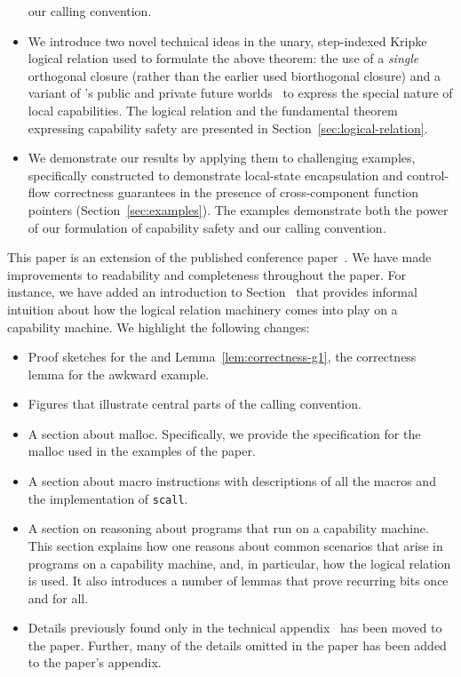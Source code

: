 \documentclass[format=acmsmall, review=true, screen=true]{acmart}
\renewcommand{\sectionname}{Section}
\newcommand\lau[1]{{\color{purple} \sf \footnotesize {LS: #1}}\\}
\renewcommand\lau[1]{}
\newenvironment{toplas}%
    {\color{OliveGreen}}{}
\begin{document}
\begin{itemize}
  our calling convention.
\item We introduce two novel technical ideas in the unary, step-indexed Kripke
  logical relation used to formulate the above theorem: the use of a
  \emph{single} orthogonal closure (rather than the earlier used biorthogonal
  closure) and a variant of \citet{Dreyer:jfp12}'s public and private future
  worlds~\citep{Dreyer:jfp12} to express the special nature of local
  capabilities. The logical relation and the fundamental theorem expressing
  capability safety are presented in \sectionname~\ref{sec:logical-relation}.
\item We demonstrate our results by applying them to challenging examples,
  specifically constructed to demonstrate local-state encapsulation and
  control-flow correctness guarantees in the presence of cross-component
  function pointers (\sectionname~\ref{sec:examples}). The examples demonstrate both
  the power of our formulation of capability safety and our calling convention.
\end{itemize}
\begin{toplas}
  This paper is an extension of the published conference paper~\citet{Skorstengaard:esop18}.
  We have made improvements to readability and completeness throughout the paper. For instance, we have added an introduction to \sectionname~ that provides informal intuition about how the logical relation machinery comes into play on a capability machine. We highlight the following changes:
  \begin{itemize}
  \item Proof sketches for the  and Lemma~\ref{lem:correctness-g1}, the correctness lemma for the awkward example.
  \item Figures that illustrate central parts of the calling convention.
  \item A section about malloc.
    Specifically, we provide the specification for the malloc used in the examples of the paper.
  \item A section about macro instructions with descriptions of all the macros and the implementation of \texttt{scall}.
  \item A section on reasoning about programs that run on a capability machine.
    This section explains how one reasons about common scenarios that arise in programs on a capability machine, and, in particular, how the logical relation is used.
    It also introduces a number of lemmas that prove recurring bits once and for all.
  \item Details previously found only in the technical appendix~\citep{technical_appendix} has been moved to the paper.
    Further, many of the details omitted in the paper has been added to the paper's appendix.
  \end{itemize}
\end{toplas}
\end{document}
